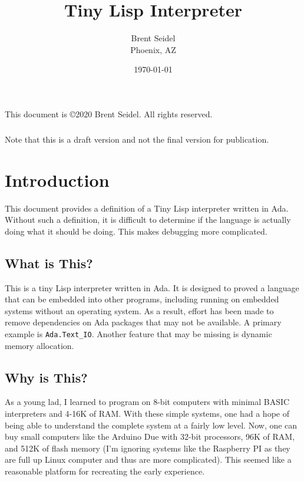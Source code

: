 \documentclass[10pt, openany]{book}
\title{Tiny Lisp Interpreter}
\author{Brent Seidel \\ Phoenix, AZ}
\date{ \today }
\newcommand{\package}[1]{\texttt{#1}}
\begin{document}
%
%
\frontmatter
\maketitle
\begin{center}
This document is \copyright 2020 Brent Seidel.  All rights reserved.

\paragraph{}Note that this is a draft version and not the final version for publication.
\end{center}
\tableofcontents

\mainmatter
\chapter{Introduction}
This document provides a definition of a Tiny Lisp interpreter written in Ada.  Without such a definition, it is difficult to determine if the language is actually doing what it should be doing.  This makes debugging more complicated.

\section{What is This?}
This is a tiny Lisp interpreter written in Ada.  It is designed to proved a language that can be embedded into other programs, including running on embedded systems without an operating system.  As a result, effort has been made to remove dependencies on Ada packages that may not be available.  A primary example is \package{Ada.Text\_IO}.  Another feature that may be missing is dynamic memory allocation.

\section{Why is This?}
As a young lad, I learned to program on 8-bit computers with minimal BASIC interpreters and 4-16K of RAM.  With these simple systems, one had a hope of being able to understand the complete system at a fairly low level.  Now, one can buy small computers like the Arduino Due with 32-bit processors, 96K of RAM, and 512K of flash memory (I'm ignoring systems like the Raspberry PI as they are full up Linux computer and thus are more complicated).  This seemed like a reasonable platform for recreating the early experience.
\end{document}

